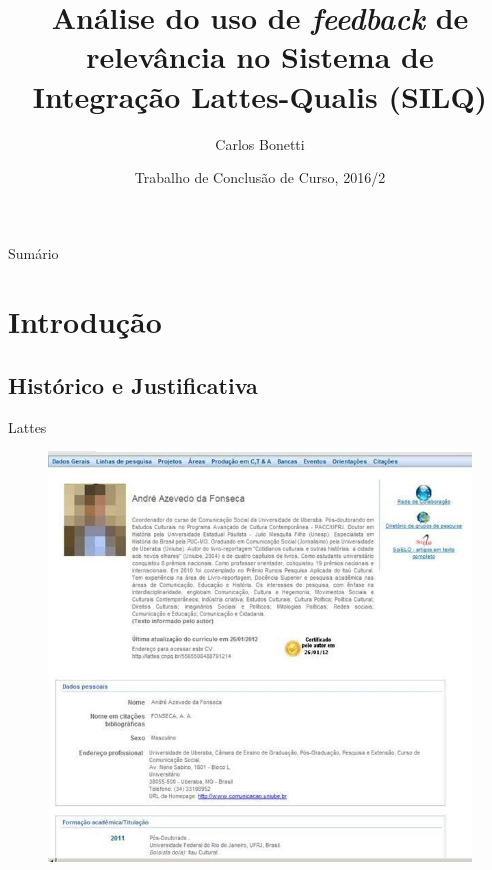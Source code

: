 \documentclass{beamer}
\title{Análise do uso de \textit{feedback} de relevância no Sistema de Integração Lattes-Qualis (SILQ)}
\author{Carlos Bonetti\inst{1}}
\institute[Universidade Federal de Santa Catarina] %
{
  \inst{1}%
  Bacharelando de Ciência da Computação\\
  Departamento de Informática e Estatística\\
  Centro Tecnológico\\
  Universidade Federal de Santa Catarina\\
  \hfill \\
  Orientação: Profª. Drª. Carina F. Dorneles
}
\date{Trabalho de Conclusão de Curso, 2016/2}
\begin{document}
\begin{frame}
  \titlepage
\end{frame}

\begin{frame}{Sumário}
  \tableofcontents
\end{frame}

\section{Introdução}

\subsection{Histórico e Justificativa}

\begin{frame}{Lattes}
  \begin{figure}
    \includegraphics[scale=0.3]{figuras/lattes.jpg}
  \end{figure}
\end{frame}
\end{document}
